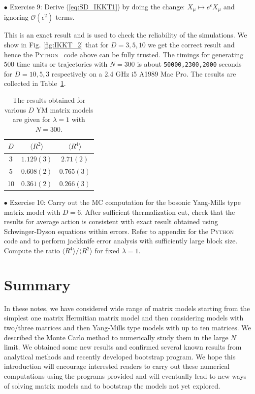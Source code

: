 \documentclass[11pt]{article}
\newcommand{\PY}{\textsc{Python}}
\begin{document}
\begin{mdframed}[backgroundcolor=blue!3] 
	\textsc{} 
	$\bullet$ Exercise 9: Derive (\ref{eq:SD_IKKT1}) by doing the change: $X_{\mu} \mapsto e^{\epsilon}X_{\mu}$ and ignoring 
	$\mathcal{O}(\epsilon^{2})$ terms.
\end{mdframed}

This is an exact result and is used to check the reliability of the simulations. 
We show in Fig. \ref{fig:IKKT_2} that for $D=3,5,10$ we get the correct result and 
hence the \PY~ code above can be fully trusted. The timings for generating 500 time units or trajectories 
with $N=300$ is about \texttt{50000,2300,2000} seconds for $D = 10, 5, 3$ respectively on 
a 2.4 GHz i5 A1989 Mac Pro. The results are collected in Table~\ref{table:D_IKKT_data}. 
\begin{table}[h!]
	\centering
	\begin{tabular}{||c c c||} 
		\hline
		$D$ & $ \langle R^2 \rangle$ & $ \langle R^4 \rangle$ \\ [0.5ex] 
		\hline\hline
		3 & $1.129(3) $ & $2.71(2) $  \\ 
		5 & $0.608(2) $ & $0.765(3) $  \\
		10 & $0.361(2)$ & $0.266(3)$
		 \\ [1ex] 
		\hline 
	\end{tabular}
\caption{The results obtained for various $D$ YM matrix models are given for $\lambda=1$ with $N=300$.}
\label{table:D_IKKT_data}
\end{table}

\begin{mdframed}[backgroundcolor=blue!3] 
	\textsc{} 
	$\bullet$ Exercise 10: Carry out the MC computation for the bosonic Yang-Mills type matrix model with $D=6$. After sufficient thermalization cut, check that the results for average action is consistent with exact result obtained using Schwinger-Dyson equations within errors. Refer to appendix for the \PY~ code and to perform jackknife error analysis with sufficiently large block size. Compute the ratio $\langle R^4 \rangle / \langle R^2 \rangle$ for fixed $\lambda=1$. 
\end{mdframed} 


\section{Summary}
In these notes, we have considered wide range of matrix models starting from the simplest one matrix Hermitian matrix model and then considering models with two/three matrices and then Yang-Mills type models with up to ten matrices. We described the Monte Carlo method 
to numerically study them in the large $N$ limit. We obtained some new results and confirmed several known results from analytical methods and recently developed bootstrap program. We hope this introduction will encourage interested readers 
to carry out these numerical computations using the programs provided and will eventually lead to new ways of solving matrix models and to bootstrap the models not yet explored.
 
\end{document}
